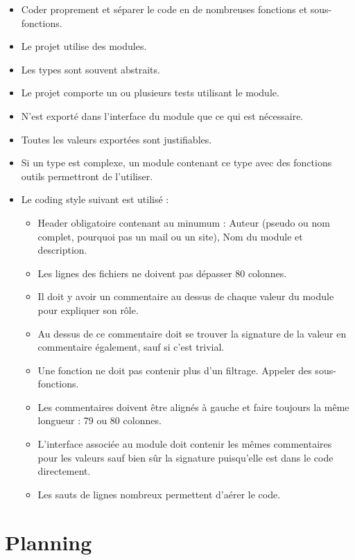 \documentclass{life-fr}
\begin{document}
\begin{itemize}
  \item Coder proprement et séparer le code en de nombreuses fonctions et sous-fonctions.
  \item Le projet utilise des modules.
  \item Les types sont souvent abstraits.
  \item Le projet comporte un ou plusieurs tests utilisant le module.
  \item N'est exporté dans l'interface du module que ce qui est nécessaire.
  \item Toutes les valeurs exportées sont justifiables.
  \item Si un type est complexe, un module contenant ce type avec des fonctions outils
    permettront de l'utiliser.
\newpage
  \item Le coding style suivant est utilisé :
    \begin{itemize}
      \item Header obligatoire contenant au minumum : Auteur (pseudo ou nom
        complet, pourquoi pas un mail ou un site), Nom du module et
        description.
      \item Les lignes des fichiers ne doivent pas dépasser 80 colonnes.
      \item Il doit y avoir un commentaire au dessus de chaque valeur du module
        pour expliquer son rôle.
      \item Au dessus de ce commentaire doit se trouver la signature de la
        valeur en commentaire également, sauf si c'est trivial.
      \item Une fonction ne doit pas contenir plus d'un filtrage. Appeler des
        sous-fonctions.
      \item Les commentaires doivent être alignés à gauche et faire toujours la
        même longueur : 79 ou 80 colonnes.
      \item L'interface associée au module doit contenir les mêmes commentaires
        pour les valeurs sauf bien sûr la signature puisqu'elle est dans le
        code directement.
      \item Les sauts de lignes nombreux permettent d'aérer le code.
    \end{itemize}
\end{itemize}


\chapter{Planning}
\end{document}
